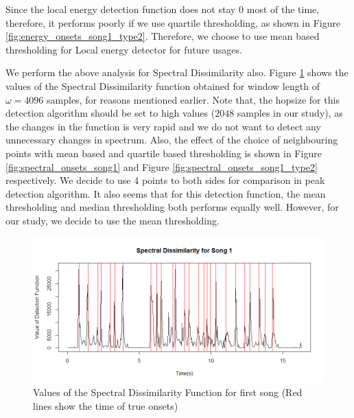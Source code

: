 \documentclass[10pt]{article}
\begin{document}
Since the local energy detection function does not stay 0 most of the time, therefore, it performs poorly if we use quartile thresholding, as shown in Figure \ref{fig:energy_onsets_song1_type2}. Therefore, we choose to use mean based thresholding for Local energy detector for future usages.

We perform the above analysis for Spectral Dissimilarity also. Figure \ref{fig:spectral_song1} shows the values of the Spectral Dissimilarity function obtained for window length of $\omega = 4096$ samples, for reasons mentioned earlier. Note that, the hopsize for this detection algorithm should be set to high values ($2048$ samples in our study), as the changes in the function is very rapid and we do not want to detect any unnecessary changes in spectrum. Also, the effect of the choice of neighbouring points with mean based and quartile based thresholding is shown in Figure \ref{fig:spectral_onsets_song1} and Figure \ref{fig:spectral_onsets_song1_type2} respectively. We decide to use 4 points to both sides for comparison in peak detection algorithm. It also seems that for this detection function, the mean thresholding and median thresholding both performs equally well. However, for our study, we decide to use the mean thresholding. 

\begin{figure}
    \centering
    \includegraphics[width = \textwidth]{spectral_song1.png}
    \caption{Values of the Spectral Dissimilarity Function for first song (Red lines show the time of true onsets)}
    \label{fig:spectral_song1}
\end{figure}
\end{document}
